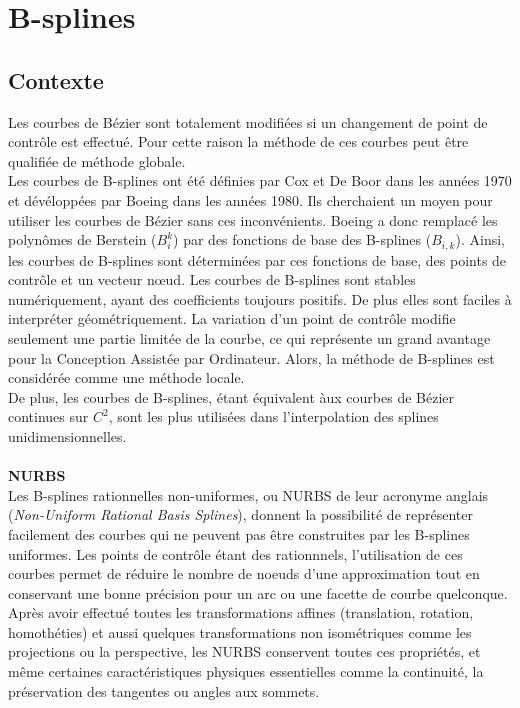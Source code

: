 \documentclass{article}
\begin{document}
\newpage
\section{B-splines}
\subsection{Contexte}
Les courbes de B\'ezier sont totalement modifi\'ees si un changement de point de contr\^ole est effectu\'e. Pour cette raison la m\'ethode de ces courbes peut \^etre qualifi\'ee de m\'ethode globale.\\
\indent
Les courbes de B-splines ont \'et\'e d\'efinies par Cox et De Boor dans les ann\'ees 1970 et d\'ev\'elopp\'ees par Boeing dans les ann\'ees 1980. Ils cherchaient un moyen pour utiliser les courbes de B\'ezier sans ces inconv\'enients. Boeing a donc remplac\'e les polyn\^omes de Berstein ($B_{i}^{k}$) par des fonctions de base des B-splines ($B_{i,k}$). Ainsi, les courbes de B-splines sont d\'etermin\'ees par ces fonctions de base, des points de contr\^ole et un vecteur n\oe ud.
Les courbes de B-splines sont stables num\'eriquement, ayant des coefficients toujours positifs. De plus elles sont faciles \`a interpr\'eter g\'eom\'etriquement. La variation d'un point de contr\^ole modifie seulement une partie limit\'ee de la courbe, ce qui repr\'esente un grand avantage pour la Conception Assist\'ee par Ordinateur. 
Alors, la m\'ethode de B-splines est consid\'er\'ee comme une m\'ethode locale.\\
\indent
De plus, les courbes de B-splines, \'etant \'equivalent \`aux courbes de B\'ezier continues sur $C^{2}$, sont les plus utilis\'ees dans l'interpolation des splines unidimensionnelles.\\
\\
\textbf{NURBS}\\
\indent
Les B-splines rationnelles non-uniformes, ou NURBS de leur acronyme anglais (\emph{Non-Uniform Rational Basis Splines}), donnent la possibilit\'e de repr\'esenter facilement des courbes qui ne peuvent pas \^etre construites par les B-splines uniformes. Les points de contr\^ole \'etant des rationnnels, l'utilisation de ces courbes permet de r\'eduire le nombre de noeuds d'une approximation tout en conservant une bonne pr\'ecision pour un arc ou une facette de courbe quelconque. \\
\indent
Apr\`es avoir effectu\'e toutes les transformations affines (translation, rotation, homoth\'eties) et aussi quelques transformations non isom\'etriques comme les projections ou la perspective, les NURBS conservent toutes ces propri\'et\'es, et m\^eme certaines caract\'eristiques physiques essentielles comme la continuit\'e, la pr\'eservation des tangentes ou angles aux sommets. \\
\end{document}
